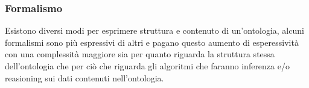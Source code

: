 	\subsubsection{Formalismo}
		Esistono diversi modi per esprimere struttura e contenuto di un'ontologia, alcuni formalismi sono più espressivi di altri e pagano questo aumento di esperessività con una complessità maggiore sia per quanto riguarda la struttura stessa dell'ontologia che per ciò che riguarda gli algoritmi che faranno inferenza e/o reasioning sui dati contenuti nell'ontologia.